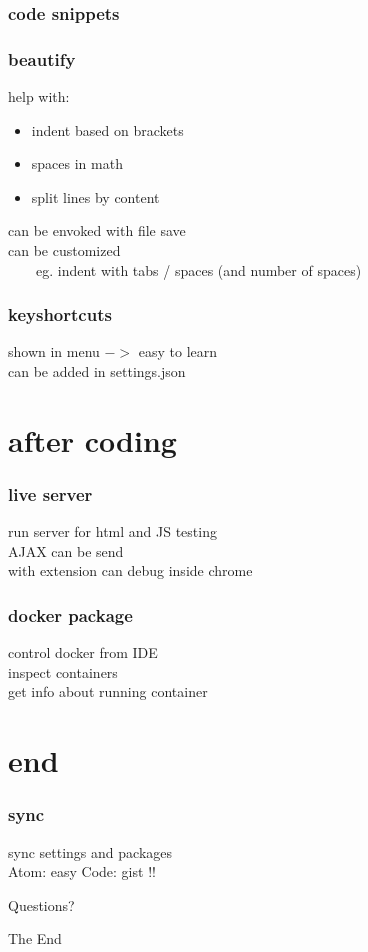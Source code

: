 \documentclass{beamer}
\begin{document}
\begin{frame}
\frametitle{code snippets}
\end{frame}

\begin{frame}
\frametitle{beautify}
help with:
\begin{itemize}
\item indent based on brackets
\item spaces in math
\item split lines by content
\end{itemize}
can be envoked with file save\\
can be customized\\
~~~~eg. indent with tabs / spaces (and number of spaces)
\end{frame}

\begin{frame}
\frametitle{keyshortcuts}
shown in menu $->$ easy to learn\\
can be added in settings.json
\end{frame}

\section{after coding}
\begin{frame}
\frametitle{live server}
run server for html and JS testing\\
AJAX can be send\\
with extension can debug inside chrome
\end{frame}

\begin{frame}
\frametitle{docker package}
control docker from IDE\\
inspect containers\\
get info about running container
\end{frame}


\section{end}
\begin{frame}
\frametitle{sync}
sync settings and packages\\
Atom: easy
Code: gist !!
\end{frame}

\begin{frame}
\Huge{\centerline{Questions?}}
\end{frame}

\begin{frame}
\Huge{\centerline{The End}}
\end{frame}
\end{document}
